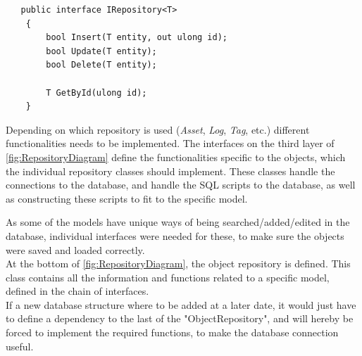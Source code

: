 \begin{listing}[H]
\begin{verbatim}
   public interface IRepository<T>
    {
        bool Insert(T entity, out ulong id);
        bool Update(T entity);
        bool Delete(T entity);

        T GetById(ulong id);
    }

\end{verbatim}
\label{code:IRepository}
\end{listing}
\par
Depending on which repository is used (\textit{Asset}, \textit{Log}, \textit{Tag}, etc.) different functionalities needs to be implemented.
The interfaces on the third layer of \autoref{fig:RepositoryDiagram} define the functionalities specific to the objects, which the individual repository classes should implement. These classes handle the connections to the database, and handle the SQL scripts to the database, as well as constructing these scripts to fit to the specific model. 
\par
As some of the models have unique ways of being searched/added/edited in the database, individual interfaces were needed for these, to make sure the objects were saved and loaded correctly. 
\\
At the bottom of \autoref{fig:RepositoryDiagram}, the object repository is defined. This class contains all the information and functions related to a specific model, defined in the chain of interfaces.
\\
If a new database structure where to be added at a later date, it would just have to define a dependency to the last of the "ObjectRepository", and will hereby be forced to implement the required functions, to make the database connection useful.
